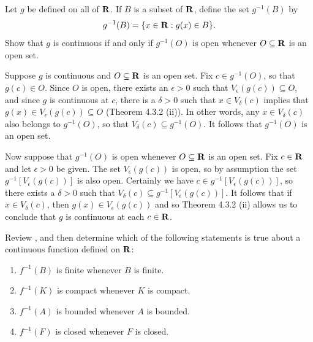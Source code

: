 \documentclass{lew98_solutions}
\begin{document}
\begin{exercise}
\label{ex:4.4.11}
    Let \( g \) be defined on all of \( \mathbf{R} \). If \( B \) is a subset of \( \mathbf{R} \), define the set \( g^{-1}(B) \) by
    \[
        g^{-1}(B) = \{ x \in \mathbf{R} : g(x) \in B \}.
    \]
    Show that \( g \) is continuous if and only if \( g^{-1}(O) \) is open whenever \( O \subseteq \mathbf{R} \) is an open set.
\end{exercise}

\begin{solution}
    Suppose \( g \) is continuous and \( O \subseteq \mathbf{R} \) is an open set. Fix \( c \in g^{-1}(O) \), so that \( g(c) \in O \). Since \( O \) is open, there exists an \( \epsilon > 0 \) such that \( V_{\epsilon}(g(c)) \subseteq O \), and since \( g \) is continuous at \( c \), there is a \( \delta > 0 \) such that \( x \in V_{\delta}(c) \) implies that \( g(x) \in V_{\epsilon}(g(c)) \subseteq O \) (Theorem 4.3.2 (ii)). In other words, any \( x \in V_{\delta}(c) \) also belongs to \( g^{-1}(O) \), so that \( V_{\delta}(c) \subseteq g^{-1}(O) \). It follows that \( g^{-1}(O) \) is an open set.

    Now suppose that \( g^{-1}(O) \) is open whenever \( O \subseteq \mathbf{R} \) is an open set. Fix \( c \in \mathbf{R} \) and let \( \epsilon > 0 \) be given. The set \( V_{\epsilon}(g(c)) \) is open, so by assumption the set \( g^{-1}[V_{\epsilon}(g(c))] \) is also open. Certainly we have \( c \in g^{-1}[V_{\epsilon}(g(c))] \), so there exists a \( \delta > 0 \) such that \( V_{\delta}(c) \subseteq g^{-1}[V_{\epsilon}(g(c))] \). It follows that if \( x \in V_{\delta}(c) \), then \( g(x) \in V_{\epsilon}(g(c)) \) and so Theorem 4.3.2 (ii) allows us to conclude that \( g \) is continuous at each \( c \in \mathbf{R} \).
\end{solution}

\begin{exercise}
\label{ex:4.4.12}
    Review , and then determine which of the following statements is true about a continuous function defined on \( \mathbf{R} \):
    \begin{enumerate}
        \item \( f^{-1}(B) \) is finite whenever \( B \) is finite.

        \item \( f^{-1}(K) \) is compact whenever \( K \) is compact.

        \item \( f^{-1}(A) \) is bounded whenever \( A \) is bounded.

        \item \( f^{-1}(F) \) is closed whenever \( F \) is closed.
    \end{enumerate}
\end{exercise}
\end{document}
